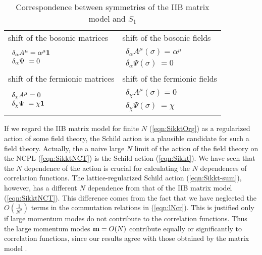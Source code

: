 \documentclass[12pt,a4paper]{article}
\begin{document}
\begin{table}
\begin{center}
\begin{tabular}{l|l}
shift of the bosonic matrices & shift of the bosonic fields\\
$ \begin{array}{l}
 \delta_\alpha A^\mu=\alpha^\mu{\bf 1}\\
 \delta_\alpha \Psi~=0
 \end{array}$
	&$ \begin{array}{l}
	 \delta_\alpha A^\mu(\sigma)=\alpha^\mu\\
	 \delta_\alpha \Psi(\sigma)~=0
	 \end{array}$\\ \hline
shift of the fermionic matrices & shift of the fermionic fields\\
$ \begin{array}{l}
 \delta_\chi A^\mu=0\\
 \delta_\chi \Psi~=\chi{\bf 1}
 \end{array}$
	&$ \begin{array}{l}
	 \delta_\chi A^\mu(\sigma)=0\\
	 \delta_\chi \Psi(\sigma)~=\chi
	 \end{array}$ \\
\end{tabular}
\caption{Correspondence between symmetries of the IIB matrix model and
$S_1$}
\label{tab:symmetry}
\end{center}
\end{table}

If we regard the IIB matrix model for finite $N$ (\ref{eqn:SikktOrg})
as a regularized action of some field theory, the Schild action
\cite{Schild} is a plausible candidate for such a field theory.
Actually, the a naive large $N$ limit of the action of the field
theory on the NCPL (\ref{eqn:SikktNCT}) is the Schild action
(\ref{eqn:Sikkt}).
We have seen that the $N$ dependence of the action is crucial for
calculating the $N$ dependences of correlation functions.
The lattice-regularized Schild action (\ref{eqn:Sikkt-sum}), however,
has a different $N$ dependence from that of the IIB matrix model
(\ref{eqn:SikktNCT}). This difference comes from the fact that we
have neglected the $O(\frac{1}{N^2})$ terms in the commutation
relations in (\ref{eqn:lNcr}). This is justified only if large
momentum modes do not contribute to the correlation functions.
Thus the large momentum modes ${\bf m} = O(N)$
contribute equally or significantly to correlation functions,
since our results agree with those obtained by the matrix
model \cite{MCsimu,alpha}.
\end{document}
